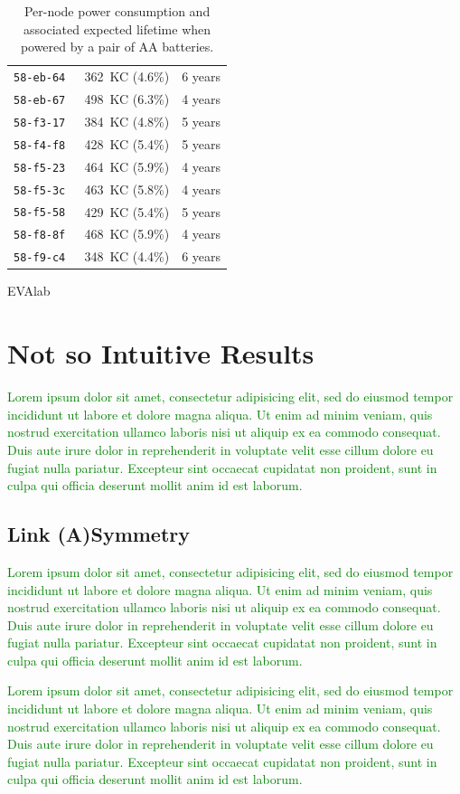 \documentclass{elsarticle}
\newcommand{\lorem}          {\textcolor{green}{Lorem ipsum dolor sit amet, consectetur adipisicing elit, sed do eiusmod tempor incididunt ut labore et dolore magna aliqua. Ut enim ad minim veniam, quis nostrud exercitation ullamco laboris nisi ut aliquip ex ea commodo consequat. Duis aute irure dolor in reprehenderit in voluptate velit esse cillum dolore eu fugiat nulla pariatur. Excepteur sint occaecat cupidatat non proident, sunt in culpa qui officia deserunt mollit anim id est laborum.}}
\begin{document}
\begin{table}
\begin{subtable}{.45\textwidth}
\begin{tabular}{|c|c|c|}
        \tt{58-eb-64} &  362~KC (4.6\%)  &  6 years \\
        \tt{58-eb-67} &  498~KC (6.3\%)  &  4 years \\
        \tt{58-f3-17} &  384~KC (4.8\%)  &  5 years \\
        \tt{58-f4-f8} &  428~KC (5.4\%)  &  5 years \\
        \tt{58-f5-23} &  464~KC (5.9\%)  &  4 years \\
        \tt{58-f5-3c} &  463~KC (5.8\%)  &  4 years \\
        \tt{58-f5-58} &  429~KC (5.4\%)  &  5 years \\
        \tt{58-f8-8f} &  468~KC (5.9\%)  &  4 years \\
        \tt{58-f9-c4} &  348~KC (4.4\%)  &  6 years \\
        \bottomrule
    \end{tabular}
    \caption{EVAlab}
\end{subtable}\hfill
\caption{Per-node power consumption and associated expected lifetime when powered by a pair of AA batteries.}
\label{tab:stats_charge}
\end{table}
\section{Not so Intuitive Results}
\label{sec:notsointuitive}

\lorem

\subsection{Link (A)Symmetry}
\label{sec:symmetry}


\lorem


\lorem

\end{document}
